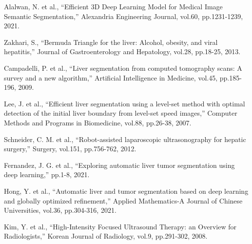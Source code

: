 \documentclass [11pt, twocolumn] {article}
\begin{document}
\begin{thebibliography}{9}
	
    Alalwan, N. et al., “Efficient 3D Deep Learning Model for Medical Image Semantic Segmentation,” Alexandria Engineering Journal, vol.60, pp.1231-1239, 2021.
    
    Zakhari, S., “Bermuda Triangle for the liver: Alcohol, obesity, and viral hepatitis,” Journal of Gastroenterology and Hepatology, vol.28, pp.18-25,  2013.
    
    Campadelli, P. et al., “Liver segmentation from computed tomography scans: A survey and a new algorithm,” Artificial Intelligence in Medicine, vol.45, pp.185-196, 2009.
    
    Lee, J. et al., “Efficient liver segmentation using a level-set method with optimal detection of the initial liver boundary from level-set speed images,” Computer Methods and Programs in Biomedicine, vol.88, pp.26-38, 2007.
    
    Schneider, C. M. et al., “Robot-assisted laparoscopic ultrasonography for hepatic surgery,” Surgery, vol.151, pp.756-762, 2012.
    
    Fernandez, J. G. et al., “Exploring automatic liver tumor segmentation using deep learning,” pp.1-8, 2021.
    
    Hong, Y. et al., “Automatic liver and tumor segmentation based on deep learning and globally optimized refinement,” Applied Mathematics-A Journal of Chinese Universities, vol.36, pp.304-316, 2021.
    
    Kim, Y. et al., “High-Intensity Focused Ultrasound Therapy: an Overview for Radiologists,” Korean Journal of Radiology, vol.9, pp.291-302, 2008.
	
\end{thebibliography}
\end{document}
